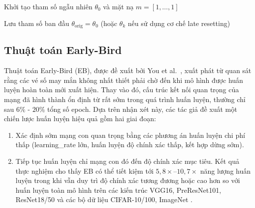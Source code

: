 \begin{algorithm}[H]
    \caption{Iterative Magnitude Pruning}


    Khởi tạo tham số ngẫu nhiên $\theta_0$ và mặt nạ $m = [1,\dots,1]$\;

    Lưu tham số ban đầu $\theta_{\text{orig}} = \theta_0$
    (hoặc $\theta_k$ nếu sử dụng cơ chế late resetting)\;



\end{algorithm}

\subsection{Thuật toán Early-Bird}
Thuật toán Early-Bird (EB), được đề xuất bởi You et al.~\cite{earlybird},
xuất phát từ quan sát rằng các vé số may mắn không nhất thiết
phải chờ đến khi mô hình được huấn luyện hoàn toàn mới xuất hiện.
Thay vào đó, cấu trúc kết nối quan trọng của mạng đã hình thành ổn định từ rất sớm trong quá trình
huấn luyện, thường chỉ sau $6\%$ - $20\%$ tổng số epoch.
Dựa trên nhận xét này, các tác giả đề xuất một chiến lược huấn luyện hiệu quả gồm hai giai đoạn:
\begin{enumerate}
    \item  Xác định sớm mạng con quan trọng bằng các phương án huấn luyện chi phí thấp
          (\gls{learning_rate} lớn, huấn luyện độ chính xác thấp, kết hợp dừng sớm).
    \item Tiếp tục huấn luyện chỉ mạng con đó đến độ chính xác mục tiêu.
          Kết quả thực nghiệm cho thấy EB có thể tiết kiệm tới $5{,}8\times$--$10{,}7\times$ năng lượng
          huấn luyện trong khi vẫn duy trì độ chính xác tương đương hoặc cao hơn so với huấn luyện toàn mô hình
          trên các kiến trúc VGG16, PreResNet101, ResNet18/50 và các bộ dữ liệu CIFAR-10/100, ImageNet \cite{earlybird}.
\end{enumerate}

